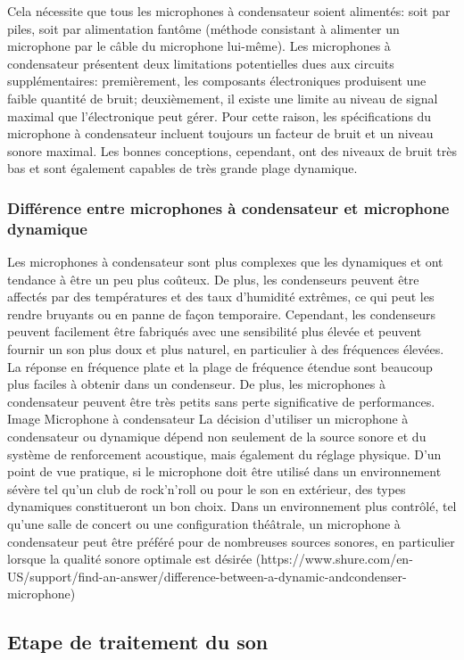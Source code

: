 \documentclass[a4paper, 12pt]{book}
\begin{document}
Cela nécessite que tous les microphones à condensateur soient alimentés: soit par piles, soit par alimentation fantôme (méthode consistant à alimenter un microphone par le câble du microphone lui-même). Les microphones à condensateur présentent deux limitations potentielles dues aux circuits supplémentaires: premièrement, les composants électroniques produisent une faible quantité de bruit; deuxièmement, il existe une limite au niveau de signal maximal que l’électronique peut gérer. Pour cette raison, les spécifications du microphone à condensateur incluent toujours un facteur de bruit et un niveau sonore maximal. Les bonnes conceptions, cependant, ont des niveaux de bruit très bas et sont également capables de très grande plage dynamique.

\subsubsection{Différence entre microphones à condensateur et microphone dynamique}

Les microphones à condensateur sont plus complexes que les dynamiques et ont tendance à être un peu plus coûteux. De plus, les condenseurs peuvent être affectés par des températures et des taux d'humidité extrêmes, ce qui peut les rendre bruyants ou en panne de façon temporaire. Cependant, les condenseurs peuvent facilement être fabriqués avec une sensibilité plus élevée et peuvent fournir un son plus doux et plus naturel, en particulier à des fréquences élevées. La réponse en fréquence plate et la plage de fréquence étendue sont beaucoup plus faciles à obtenir dans un condenseur. De plus, les microphones à condensateur peuvent être très petits sans perte significative de performances. Image Microphone à condensateur La décision d’utiliser un microphone à condensateur ou dynamique dépend non seulement de la source sonore et du système de renforcement acoustique, mais également du réglage physique. D'un point de vue pratique, si le microphone doit être utilisé dans un environnement sévère tel qu'un club de rock'n'roll ou pour le son en extérieur, des types dynamiques constitueront un bon choix. Dans un environnement plus contrôlé, tel qu'une salle de concert ou une configuration théâtrale, un microphone à condensateur peut être préféré pour de nombreuses sources sonores, en particulier lorsque la qualité sonore optimale est désirée (https://www.shure.com/en-US/support/find-an-answer/difference-between-a-dynamic-andcondenser-microphone)

\subsection{Etape de traitement du son}
\end{document}
